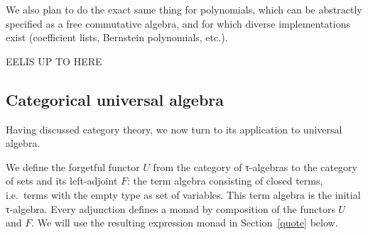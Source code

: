 \documentclass[a4paper,10pt,runningheads]{llncs}
\begin{document}
We also plan to do the exact same thing for polynomials, which can be abstractly specified as a free commutative algebra, and for which diverse implementations exist (coefficient lists, Bernstein polynomials, etc.).




EELIS UP TO HERE



\subsection{Categorical universal algebra}
Having discussed category theory, we now turn to its application to universal algebra.

We define the forgetful functor $U$ from the category of τ-algebras to the category of sets and its left-adjoint $F$: the term algebra consisting of closed terms, i.e.\ terms with the empty type as set of variables. This term algebra is the initial τ-algebra. Every adjunction defines a monad by composition of the functors $U$ and $F$. We will use the resulting expression monad in Section~\ref{quote} below.



\begin{comment}
Given a sub\emph{set} of an algebra, we define the sub\emph{algebra} generated by it.
An interesting fact to mention is the use of the following heterogeneous equality between
elements of the algebra and of the subalgebra, i.e.\ terms of different types may be equal.
\begin{lstlisting}
  Fixpoint heq {o}: op_type carrier o -> op_type v o -> Prop :=
    match o with
    | constant x => fun a b => `a == b
    | function x y => fun a b => forall u, heq (a u) (b (`u))
    end.
\end{lstlisting}
\end{comment}
\end{document}
